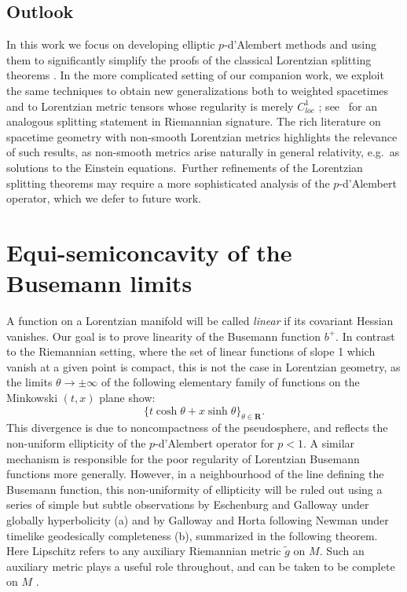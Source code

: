 \documentclass[12pt]{amsart}
\newcommand{\R}{{\mathbf R}}
\begin{document}
\subsection{Outlook}

In this work we focus on developing elliptic $p$-d'Alembert methods and using them to significantly simplify the proofs of the classical Lorentzian splitting theorems \cite{Eschenburg88, Galloway89, Newman90, GallowayHorta96}. In the more complicated setting of our companion work, we exploit the same techniques to obtain new generalizations both to weighted spacetimes and to Lorentzian metric tensors whose regularity is merely $C^1_{loc}$ \cite{BGMOS25+}; see~\cite{KunzingerOhanyanVardabasso25} for an analogous splitting statement in Riemannian signature. The rich literature on spacetime geometry with non-smooth Lorentzian metrics \cite{KunzingerSteinbauerStojkovicVickers2015, KunzingerSteinbauerVickers15, GrafGrantKunzingerSteinbauer18, Graf20, KunzingerOhanyanSchinnerlSteinbauer2022} highlights the relevance of such results, as non-smooth metrics arise naturally in general relativity, e.g.\ as solutions to the Einstein equations.\ Further refinements of the Lorentzian splitting theorems may require a more sophisticated analysis of the $p$-d'Alembert operator, which
we defer to future work.

\section{Equi-semiconcavity of the Busemann limits}

A function on a Lorentzian manifold will be called {\em linear} if its covariant Hessian vanishes. Our goal is to prove linearity of the Busemann function $b^+$.  
In contrast to the Riemannian setting,  where the set of linear functions of slope 1 which vanish at a given point is compact,
this is not the case in Lorentzian geometry,  as the limits $\theta \to \pm \infty$ of the following elementary family of functions on the Minkowski $(t,x)$ plane show: 
\begin{equation}\label{divergent linear family}
\{t \cosh \theta + x \sinh \theta\}_{\theta \in \R}.
\end{equation}
This divergence is due to noncompactness of the pseudosphere,
and reflects the non-uniform ellipticity of the $p$-d'Alembert operator for $p<1$. A similar mechanism is responsible
for the poor regularity of Lorentzian Busemann functions more generally.  However, in a neighbourhood of the line defining the Busemann function,  this non-uniformity of ellipticity will be ruled out using a series of simple but subtle observations by Eschenburg \cite{Eschenburg88} and Galloway \cite{Galloway89} %
{under globally hyperbolicity} (a) and by Galloway and Horta \cite{GallowayHorta96} following Newman \cite{Newman90} %
{under timelike geodesically completeness} (b),
summarized in the following theorem.
Here Lipschitz refers to any auxiliary Riemannian metric $\tilde g$ on $M$.  Such an auxiliary metric plays a useful role throughout,
{and can be taken to be complete on $M$ \cite{NomizuOzeki61,Geroch68}.}
\end{document}
